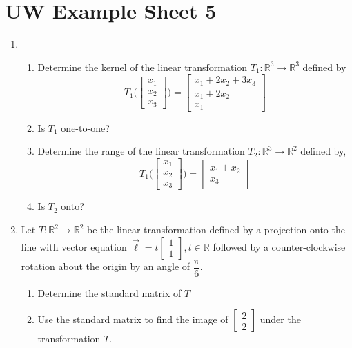\documentclass{report}
\newcommand{\R}{{\mathbb{R}}}
\begin{document}
\chapter*{UW Example Sheet 5}
\begin{enumerate}
    \item \begin{enumerate}
        \item Determine the kernel of the linear transformation $T_1: \R^3 \to \R^3$ defined by
        $$T_1\Bigg(\begin{bmatrix} x_1 \\ x_2 \\ x_3 \end{bmatrix}\Bigg) = \begin{bmatrix}
        x_1 + 2x_2 + 3x_3\\
        x_1 + 2x_2 \\
        x_1\end{bmatrix}$$
        \item Is $T_1$ one-to-one?
        \item Determine the range of the linear transformation $T_2: \R^3 \to \R^2$ defined by,
        $$T_1\Bigg(\begin{bmatrix} x_1 \\ x_2 \\ x_3 \end{bmatrix}\Bigg) = \begin{bmatrix}
        x_1 + x_2 \\
        x_3\end{bmatrix}$$
        \item Is $T_2$ onto?
    \end{enumerate}
    \item Let $T: \R^2 \to \R^2$ be the linear transformation defined by a projection onto the line with vector equation $\vec{\ell} = t \begin{bmatrix} 1 \\ 1\end{bmatrix}, t \in \R$ followed by a counter-clockwise rotation about the origin by an angle of $\dfrac{\pi}{6}$.
    \begin{enumerate}
        \item Determine the standard matrix of $T$
        \item Use the standard matrix to find the image of $\begin{bmatrix} 2 \\ 2\end{bmatrix}$ under the transformation $T$.

\end{enumerate}
\end{enumerate}
\end{document}

